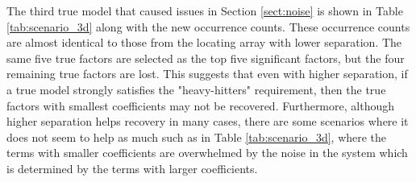 The third true model that caused issues in Section \ref{sect:noise} is shown in Table \ref{tab:scenario_3d} along with the new occurrence counts.
These occurrence counts are almost identical to those from the locating array with lower separation.
The same five true factors are selected as the top five significant factors, but the four remaining true factors are lost.
This suggests that even with higher separation, if a true model strongly satisfies the "heavy-hitters" requirement, then the true factors with smallest coefficients may not be recovered.
Furthermore, although higher separation helps recovery in many cases, there are some scenarios where it does not seem to help as much such as in Table \ref{tab:scenario_3d}, where the terms with smaller coefficients are overwhelmed by the noise in the system which is determined by the terms with larger coefficients.

